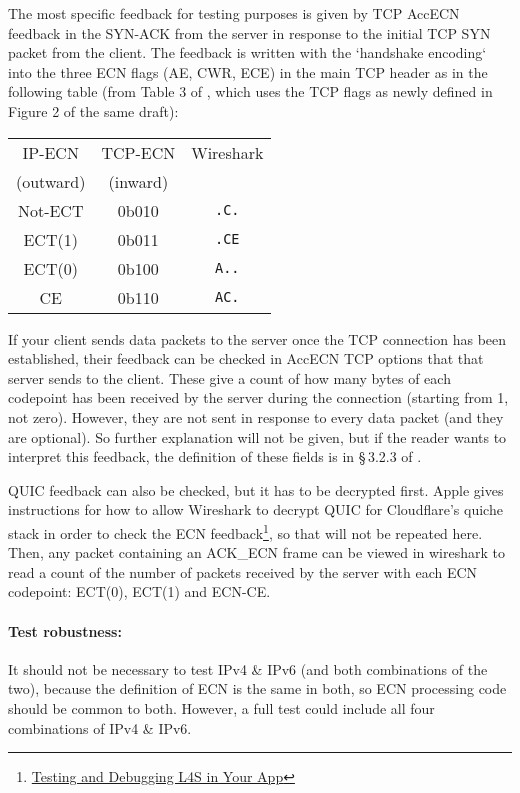 The most specific feedback for testing purposes is given by TCP AccECN feedback in the SYN-ACK from the server in response to the initial TCP SYN packet from the client. The feedback is written with the `handshake encoding` into the three ECN flags (AE, CWR, ECE) in the main TCP header as in the following table (from Table 3 of \cite{Briscoe14d:accecn_ID}, which uses the TCP flags as newly defined in Figure 2 of the same draft):

{\centering
\begin{tabular}{ccc}
	IP-ECN    & TCP-ECN  & Wireshark\\
	(outward) & (inward) &\\
	\hline%
	Not-ECT   & 0b010    & \texttt{.C.}\\
	ECT(1)    & 0b011    & \texttt{.CE}\\
	ECT(0)    & 0b100    & \texttt{A..}\\
	CE        & 0b110    & \texttt{AC.}\\
	\hline
\end{tabular}
\par}

If your client sends data packets to the server once the TCP connection has been established, their feedback can be checked in AccECN TCP options that that server sends to the client. These give a count of how many bytes of each codepoint has been received by the server during the connection (starting from 1, not zero). However, they are not sent in response to every data packet (and they are optional). So further explanation will not be given, but if the reader wants to interpret this feedback, the definition of these fields is in \S\,3.2.3 of \cite{Briscoe14d:accecn_ID}.

QUIC feedback can also be checked, but it has to be decrypted first. Apple gives instructions for how to allow Wireshark to decrypt QUIC for Cloudflare's quiche stack in order to check the ECN  feedback\footnote{\href{https://developer.apple.com/documentation/network/testing_and_debugging_l4s_in_your_app}{Testing and Debugging L4S in Your App}}, so that will not be repeated here. Then, any packet containing an ACK\_ECN frame can be viewed in wireshark to read a count of the number of packets received by the server with each ECN codepoint: ECT(0), ECT(1) and ECN-CE.

\paragraph{Test robustness:} It should not be necessary to test IPv4 \& IPv6 (and both combinations of the two), because the definition of ECN is the same in both, so ECN processing code should be common to both. However, a full test could include all four combinations of IPv4 \& IPv6.

